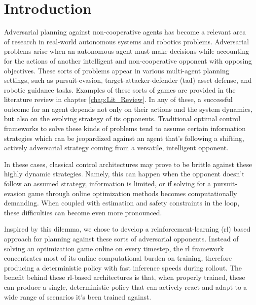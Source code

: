 \chapter{Introduction}


Adversarial planning against non-cooperative agents has become a relevant area of research in real-world autonomous systems and robotics problems. Adversarial problems arise when an autonomous agent must make decisions while accounting for the actions of another intelligent and non-cooperative opponent with opposing objectives. These sorts of problems appear in various multi-agent planning settings, such as pursuit-evasion, target-attacker-defender (\acs{tad}) asset defense, and robotic guidance tasks. Examples of these sorts of games are provided in the literature review in chapter \ref{chap:Lit_Review}. In any of these, a successful outcome for an agent depends not only on their actions and the system dynamics, but also on the evolving strategy of its opponents. Traditional optimal control frameworks to solve these kinds of problems tend to assume certain information strategies which can be jeopardized against an agent that's following a shifting, actively adversarial strategy coming from a versatile, intelligent opponent. 

In these cases, classical control architectures may prove to be brittle against these highly dynamic strategies. Namely, this can happen when the opponent doesn't follow an assumed strategy, information is limited, or if solving for a pursuit-evasion game through online optimization methods becomes computationally demanding. When coupled with estimation and safety constraints in the loop, these difficulties can become even more pronounced.

Inspired by this dilemma, we chose to develop a reinforcement-learning (\acs{rl}) based approach for planning against these sorts of adversarial opponents. Instead of solving an optimization game online on every timestep, the \acs{rl} framework concentrates most of its online computational burden on training, therefore producing a deterministic policy with fast inference speeds during rollout. The benefit behind these \acs{rl}-based architectures is that, when properly trained, these can produce a single, deterministic policy that can actively react and adapt to a wide range of scenarios it's been trained against.

